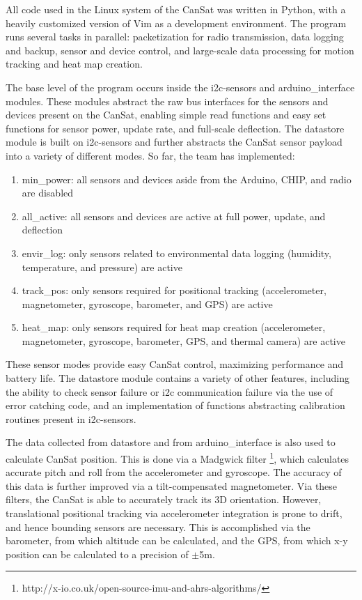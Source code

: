 \documentclass[]{report}
\begin{document}
		All code used in the Linux system of the CanSat was written in Python, with a heavily customized version of Vim as a development environment. The program runs several tasks in parallel: packetization for radio transmission, data logging and backup, sensor and device control, and large-scale data processing for motion tracking and heat map creation.
		
		The base level of the program occurs inside the i2c-sensors and arduino\_interface modules. These modules abstract the raw bus interfaces for the sensors and devices present on the CanSat, enabling simple read functions and easy set functions for sensor power, update rate, and full-scale deflection. The datastore module is built on i2c-sensors and further abstracts the CanSat sensor payload into a variety of different modes. So far, the team has implemented:
		
		\begin{enumerate}
			\item min\_power: all sensors and devices aside from the Arduino, CHIP, and radio are disabled
			\item all\_active: all sensors and devices are active at full power, update, and deflection
			\item envir\_log: only sensors related to environmental data logging (humidity, temperature, and pressure) are active
			\item track\_pos: only sensors required for positional tracking (accelerometer, magnetometer, gyroscope, barometer, and GPS) are active
			\item heat\_map: only sensors required for heat map creation (accelerometer, magnetometer, gyroscope, barometer, GPS, and thermal camera) are active
		\end{enumerate}
		
		These sensor modes provide easy CanSat control, maximizing performance and battery life. The datastore module contains a variety of other features, including the ability to check sensor failure or i2c communication failure via the use of error catching code, and an implementation of functions abstracting calibration routines present in i2c-sensors.
		
		The data collected from datastore and from arduino\_interface is also used to calculate CanSat position. This is done via a Madgwick filter \footnote{http://x-io.co.uk/open-source-imu-and-ahrs-algorithms/}, which calculates accurate pitch and roll from the accelerometer and gyroscope. The accuracy of this data is further improved via a tilt-compensated magnetometer. Via these filters, the CanSat is able to accurately track its 3D orientation.
		However, translational positional tracking via accelerometer integration is prone to drift, and hence bounding sensors are necessary. This is accomplished via the barometer, from which altitude can be calculated, and the GPS, from which x-y position can be calculated to a precision of $\pm$5m.
		
\end{document}
